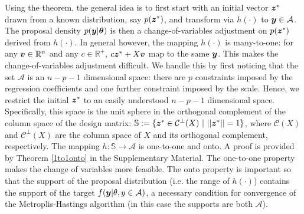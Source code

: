 \documentclass[ba]{imsart}
\def\bth{\mbox{\boldmath $\theta$}}
\newcommand{\by}{\mbox{\boldmath $y$}}
\newcommand{\bz}{\mbox{\boldmath $z$}}
\newcommand{\bv}{\mbox{\boldmath $v$}}
\begin{document}
\noindent Using the theorem, the general idea is to first start with an initial vector $\bz^*$ drawn from a known distribution, say $p(\bz^*)$, and transform via $h(\cdot)$ to $\by \in \mathcal{A}$. The proposal density $p(\by|\bth)$ is then a change-of-variables adjustment on $p(\bz^*)$ derived from $h(\cdot)$.
In general however, the mapping $h(\cdot)$ is many-to-one: for any $\bv\in \mathbb{R}^{n}$ and any $c\in \mathbb{R}^{+}$, $c\bz^{*} + X\bv$ map to the same $\by$. This makes the change-of-variables adjustment difficult.
We handle this by first noticing that the set $\mathcal{A}$ is an $n - p - 1$ dimensional space:  there are $p$ constraints imposed by the regression coefficients and one further constraint imposed by the scale. Hence, we restrict the initial $\bz^*$ to an easily understood $n - p - 1$ dimensional space.  Specifically, this space is  the unit sphere in the orthogonal complement of the column space of the design matrix: $\mathbb{S} := \{\bz^* \in \mathcal{C}^{\perp}(X)\  |\  ||\bz^*|| = 1\}$, where $\mathcal{C}(X)$ and  $\mathcal{C}^{\perp}(X)$ are the column space of $X$ and its orthogonal complement, respectively. The mapping $h: \mathbb{S} \rightarrow \mathcal{A}$ is one-to-one and onto. A proof is provided by Theorem \ref{1to1onto} in the Supplementary Material.  The one-to-one property makes the change of variables more feasible. The onto property is important so that the support of the proposal distribution (i.e. the range of $h(\cdot)$) contains the support of the target  $f(\by | \theta, y\in \mathcal{A})$, a necessary condition for convergence of the Metroplis-Hastings algorithm (in this case the supports are both $\mathcal{A}$). 
\end{document}

